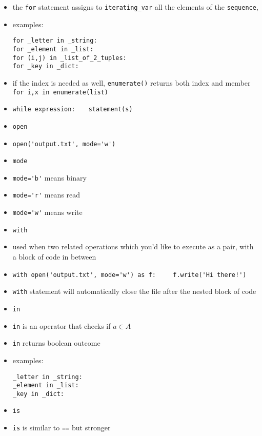 \documentclass[onecolumn]{IEEEtran} %
\begin{document}
\begin{itemize}
    \bi
        \item the \verb|for| statement assigns to \verb|iterating_var| all the elements of the \verb|sequence|,
        \item examples:
        \begin{verbatim}
for _letter in _string:
for _element in _list:
for (i,j) in _list_of_2_tuples:
for _key in _dict:
        \end{verbatim}
        \item if the index is needed as well, \verb|enumerate()| returns both index and member \newline
            \verb|for i,x in enumerate(list)|
    \ei
    \item \verb|while expression:| \newline
         \verb|   statement(s)|
    \item \verb|open|
    \bi
        \item \verb|open('output.txt', mode='w')|
        \item \verb|mode|
        \bi
            \item \verb|mode='b'| means binary
            \item \verb|mode='r'| means read
            \item \verb|mode='w'| means write
        \ei
    \ei
    \item \verb|with|
    \bi
        \item used when two related operations which you'd like to execute as a pair, with a block of code in between
        \item \verb|with open('output.txt', mode='w') as f:| \newline
            \verb|    f.write('Hi there!')|
        \item  \verb|with| statement will automatically close the file after the nested block of code
    \ei
    \item \verb|in|
    \bi
        \item \verb|in| is an operator that checks if $a \in A$
        \item \verb|in| returns boolean outcome
        \item examples:
        \begin{verbatim}
_letter in _string:
_element in _list:
_key in _dict:
        \end{verbatim}
    \ei
    \item \verb|is|
    \bi
        \item \verb|is| is similar to \verb|==| but stronger

\end{itemize}
\end{document}
